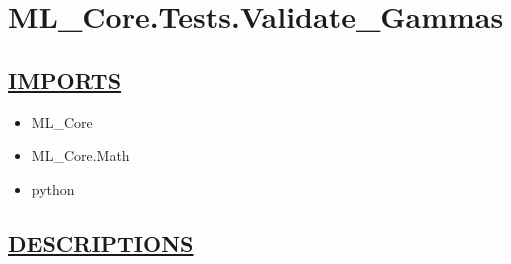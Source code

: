 \chapter*{ML\_Core.Tests.Validate\_Gammas}
\hypertarget{ecldoc:toc:ML_Core.Tests.Validate_Gammas}{}

\section*{\underline{IMPORTS}}
\begin{itemize}
\item ML\_Core
\item ML\_Core.Math
\item python
\end{itemize}

\section*{\underline{DESCRIPTIONS}}

